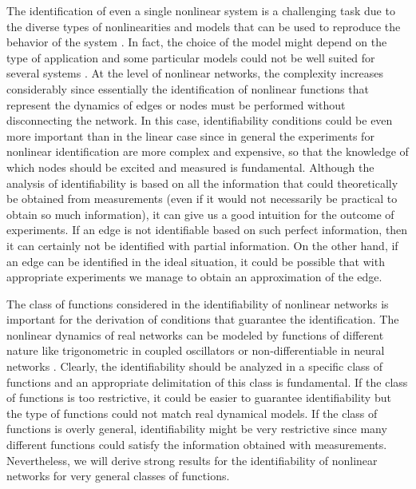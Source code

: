 \documentclass[letterpaper,10pt,journal]{IEEEtran}
\begin{document}
The identification of even a single nonlinear system is a challenging task due to the diverse types of nonlinearities and models that can be used to reproduce the behavior of the system \cite{schoukens2019nonlinear}. In fact, the choice of the model might depend on the type of application and some particular models could not be well suited for several systems \cite{janczak2004identification,nelles2020nonlinear,paduart2010identification}. At the level of nonlinear networks, the complexity increases considerably since essentially the identification of nonlinear functions that represent the dynamics of edges or nodes must be performed without disconnecting the network. In this case, identifiability conditions could be even more important than in the linear case since in general the experiments for nonlinear identification are more complex and expensive, so that the knowledge of which nodes should be excited and measured is fundamental. Although the analysis of identifiability is based on all the information that could theoretically be obtained from measurements (even if it would not necessarily be practical to obtain so much information), it can give us a good intuition for the outcome of experiments. If an edge is not identifiable based on such perfect information, then it can certainly not be identified with partial information. On the other hand, if an edge can be identified in the ideal situation, it could be possible that with appropriate experiments we manage to obtain an approximation of the edge.


The class of functions considered in the identifiability of nonlinear networks is important for the derivation of conditions that guarantee the identification. The nonlinear dynamics of real networks can be modeled by functions of different nature like trigonometric in coupled oscillators \cite{dorfler2014synchronization} or non-differentiable in neural networks \cite{aggarwal2018neural}. Clearly, the identifiability should be analyzed in a specific class of functions and an appropriate delimitation of this class is fundamental. If the class of functions is too restrictive, it could be easier to guarantee identifiability but the type of functions could not match real dynamical models. If the class of functions is overly general, identifiability might be very restrictive since many different functions could satisfy the information obtained with measurements. Nevertheless, we will derive strong results for the identifiability of nonlinear networks for very general classes of functions.
\end{document}
